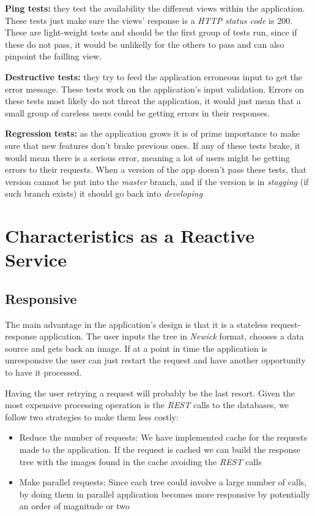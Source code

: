 \documentclass[10pt]{article}
\begin{document}
\textbf{Ping tests:} they test the availability the different views within the application. These tests just make sure the views' response is a \textit{HTTP status code} is 200. These are light-weight tests and should be the first group of tests run, since if these do not pass, it would be unlikelly for the others to pass and can also pinpoint the failling view.

\textbf{Destructive tests:} they try to feed the application erroneous input to get the error message. These tests work on the application's input validation. Errors on these tests most likely do not threat the application, it would just mean that a small group of careless users could be getting errors in their responses.

\textbf{Regression tests:} as the application grows it is of prime importance to make sure that new features don't brake previous ones. If any of these tests brake, it would mean there is a serious error, meaning a lot of users might be getting errors to their requests. When a version of the app doesn't pass these tests, that version cannot be put into the \textit{master} branch, and if the version is in \textit{stagging} (if such branch exists) it should go back into \textit{developing}

\section{Characteristics as a Reactive Service}
 \subsection{Responsive}
 	The main advantage in the application's design is that it is a stateless request-response application. The user inputs the tree in \textit{Newick} format, chooses a data source and gets back an image. If at a point in time the application is unresponsive the user can just restart the request and have another opportunity to have it processed.
 	
 	Having the user retrying a request will probably be the last resort. Given the most expensive processing operation is the \textit{REST} calls to the databases, we follow two strategies to make them less costly:
 	
 	\begin{itemize}
  		\item Reduce the number of requests: We have implemented cache for the requests made to the application. If the request is cached we can build the response tree with the images found in the cache avoiding the \textit{REST} calls
  		\item Make parallel requests: Since each tree could involve a large number of calls, by doing them in parallel application becomes more responsive by potentially an order of magnitude or two
	\end{itemize}
 	
\end{document}
